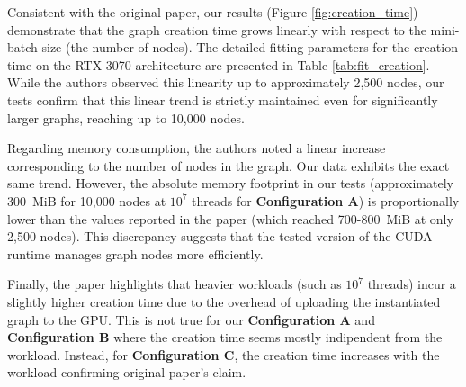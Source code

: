 \documentclass[10pt,twocolumn]{article}
\begin{document}
\begin{table}[htbp]
    \centering
    \caption{Fitting parameters for Graph Creation Time ($T_C = a \cdot S + b$) obtained from \textbf{Configuration A}}
    \label{tab:fit_creation}
    \renewcommand{\arraystretch}{1.2}
\end{table}

Consistent with the original paper, our results (Figure \ref{fig:creation_time}) demonstrate that the graph creation time grows linearly with respect to the mini-batch size (the number of nodes). The detailed fitting parameters for the creation time on the RTX 3070 architecture are presented in Table \ref{tab:fit_creation}. While the authors observed this linearity up to approximately 2,500 nodes, our tests confirm that this linear trend is strictly maintained even for significantly larger graphs, reaching up to 10,000 nodes. 

Regarding memory consumption, the authors noted a linear increase corresponding to the number of nodes in the graph. Our data exhibits the exact same trend. However, the absolute memory footprint in our tests (approximately 300~MiB for 10,000 nodes at \(10^7\) threads for \textbf{Configuration A}) is proportionally lower than the values reported in the paper (which reached 700-800~MiB at only 2,500 nodes). This discrepancy suggests that the tested version of the CUDA runtime manages graph nodes more efficiently.

Finally, the paper highlights that heavier workloads (such as \(10^7\) threads) incur a slightly higher creation time due to the overhead of uploading the instantiated graph to the GPU. 
This is not true for our \textbf{Configuration A} and \textbf{Configuration B} where the creation time seems mostly indipendent from the workload. Instead, for \textbf{Configuration C}, the creation time increases with the workload confirming original paper's claim.
\end{document}
